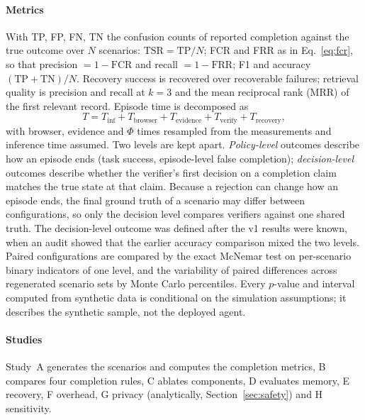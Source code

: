 \paragraph{Metrics} With TP, FP, FN, TN the confusion counts of reported completion against the true outcome over $N$ scenarios: $\mathrm{TSR}=\mathrm{TP}/N$; FCR and FRR as in Eq.~\eqref{eq:fcr}, so that precision $=1-\mathrm{FCR}$ and recall $=1-\mathrm{FRR}$; F1 and accuracy $(\mathrm{TP}+\mathrm{TN})/N$. Recovery success is recovered over recoverable failures; retrieval quality is precision and recall at $k=3$ and the mean reciprocal rank (MRR) of the first relevant record. Episode time is decomposed as
\begin{equation}
T = T_{\mathrm{inf}} + T_{\mathrm{browser}} + T_{\mathrm{evidence}} + T_{\mathrm{verify}} + T_{\mathrm{recovery}},
\label{eq:time}
\end{equation}
with browser, evidence and $\Phi$ times resampled from the measurements and inference time assumed. Two levels are kept apart. \emph{Policy-level} outcomes describe how an episode ends (task success, episode-level false completion); \emph{decision-level} outcomes describe whether the verifier's first decision on a completion claim matches the true state at that claim. Because a rejection can change how an episode ends, the final ground truth of a scenario may differ between configurations, so only the decision level compares verifiers against one shared truth. The decision-level outcome was defined after the v1 results were known, when an audit showed that the earlier accuracy comparison mixed the two levels. Paired configurations are compared by the exact McNemar test on per-scenario binary indicators of one level, and the variability of paired differences across regenerated scenario sets by Monte Carlo percentiles. Every $p$-value and interval computed from synthetic data is conditional on the simulation assumptions; it describes the synthetic sample, not the deployed agent.

\paragraph{Studies} Study~A generates the scenarios and computes the completion metrics, B compares four completion rules, C ablates components, D evaluates memory, E recovery, F overhead, G privacy (analytically, Section~\ref{sec:safety}) and H sensitivity.

